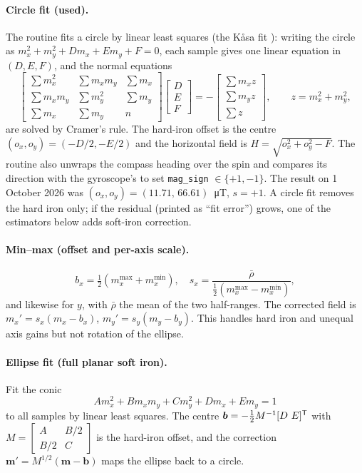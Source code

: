 \paragraph{Circle fit (used).} The routine fits a circle by linear least
squares (the K{\aa}sa fit \cite{kasa1976circle}): writing the circle as
$m_x^2+m_y^2+Dm_x+Em_y+F=0$, each sample gives one linear equation in
$(D,E,F)$, and the normal equations
\begin{equation}\label{eq:kasa}
\begin{bmatrix}\sum m_x^2&\sum m_xm_y&\sum m_x\\
\sum m_xm_y&\sum m_y^2&\sum m_y\\
\sum m_x&\sum m_y&n\end{bmatrix}
\begin{bmatrix}D\\E\\F\end{bmatrix}
=-\begin{bmatrix}\sum m_x z\\ \sum m_y z\\ \sum z\end{bmatrix},
\qquad z=m_x^2+m_y^2,
\end{equation}
are solved by Cramer's rule. The hard-iron offset is the centre
$(o_x,o_y)=(-D/2,-E/2)$ and the horizontal field is
$H=\sqrt{o_x^2+o_y^2-F}$. The routine also unwraps the compass heading over
the spin and compares its direction with the gyroscope's to set
\texttt{mag\_sign} $\in\{+1,-1\}$. The result on 1 October 2026 was
$(o_x,o_y)=(11.71,\,66.61)$~\si{\micro T}, $s=+1$. A circle fit removes the
hard iron only; if the residual (printed as ``fit error'') grows, one of the
estimators below adds soft-iron correction.

\paragraph{Min--max (offset and per-axis scale).}
\begin{equation}\label{eq:minmax}
b_x=\tfrac12(m_x^{\max}+m_x^{\min}),\quad
s_x=\frac{\bar\rho}{\tfrac12(m_x^{\max}-m_x^{\min})},
\end{equation}
and likewise for $y$, with $\bar\rho$ the mean of the two half-ranges. The
corrected field is $m_x'=s_x(m_x-b_x)$, $m_y'=s_y(m_y-b_y)$. This handles
hard iron and unequal axis gains but not rotation of the ellipse.

\paragraph{Ellipse fit (full planar soft iron).} Fit the conic
\begin{equation}
A m_x^2 + B m_xm_y + C m_y^2 + D m_x + E m_y = 1
\end{equation}
to all samples by linear least squares. The centre
$\bm b = -\tfrac12 M^{-1}[D\ E]^{\mathsf T}$ with
$M=\begin{bmatrix}A&B/2\\B/2&C\end{bmatrix}$ is the hard-iron offset, and the
correction $\bm m' = M^{1/2}(\bm m-\bm b)$ maps the ellipse back to a circle.

